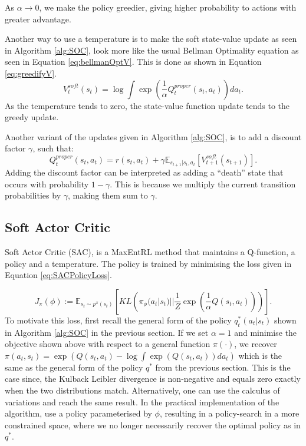 \documentclass{report}
\numberwithin{equation}{section}
\numberwithin{figure}{section}
\numberwithin{table}{section}
\numberwithin{algorithm}{section}
\begin{document}
As $\alpha\rightarrow 0$, we make the policy greedier, giving 
higher probability to actions with greater advantage.

Another way to use a temperature is to make the soft state-value 
update as seen in Algorithm \ref{alg:SOC}, look more like the 
usual Bellman Optimality equation as seen in Equation \ref{eq:bellmanOptV}.
This is done as shown in Equation \ref{eq:greedifyV}.
\begin{equation}\label{eq:greedifyV}
  V^{soft}_t(s_t)=\log \int \exp(\frac{1}{\alpha}Q^{proper}_t(s_t,a_t))da_t.
\end{equation}
As the temperature tends to zero, the state-value function update 
tends to the greedy update.

Another variant of the updates given in Algorithm \ref{alg:SOC}, 
is to add a discount factor $\gamma$, such that:
\begin{equation*}
  Q^{proper}_t(s_t,a_t)=r(s_t,a_t) + \gamma \mathbb{E}_{s_{t+1}|s_t,a_t}[V^{soft}_{t+1}(s_{t+1})].
\end{equation*}
Adding the discount factor can be interpreted as adding a ``death'' 
state that occurs with probability $1-\gamma$. This is because 
we multiply the current transition probabilities by $\gamma$, making 
them sum to $\gamma$.

\subsection{Soft Actor Critic}\label{sec:SAC}
Soft Actor Critic (SAC), is a MaxEntRL method that maintains 
a Q-function, a policy and a temperature. The policy 
is trained by minimising the loss given in Equation \ref{eq:SACPolicyLoss}.

\begin{equation}\label{eq:SACPolicyLoss}
  J_\pi(\phi):=\mathbb{E}_{s_t\sim p^\pi(s_t)}\left[KL\left(\pi_\phi(a_t|s_t)||\frac{1}{Z}\exp\left(\frac{1}{\alpha}Q(s_t,a_t)\right)\right)\right].
\end{equation}
To motivate this loss, first recall the general form of the policy 
$q^*_t(a_t|s_t)$ shown in Algorithm \ref{alg:SOC} in the previous
section. If we set $\alpha=1$ and 
minimise the objective shown above with respect to a general function 
$\pi(\cdot)$, we recover $\pi(a_t,s_t)=\exp(Q(s_t,a_t) - \log \int \exp(Q(s_t,a_t))da_t)$ 
which is the same as the general form of the policy $q^*$ from 
the previous section. This is the case since, the Kulback Leibler 
divergence is non-negative and equals zero exactly when the 
two distributions match. Alternatively, one can use the 
calculus of variations and reach the same result. In 
the practical implementation of the algorithm, \cite{SAC2} use 
a policy parameterised by $\phi$, resulting in a policy-search 
in a more constrained space, where we no longer necessarily recover 
the optimal policy as in $q^*$.
\end{document}
